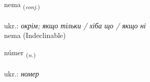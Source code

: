 \documentclass[frontgrid, backgrid]{flacards}\usepackage[]{graphicx}\usepackage[]{xcolor}
\begin{document}

\renewcommand{\flhead}{\vskip5pt \fboxsep=0pt {\small\bfseries\footnotesize Samtenging | сполучник}}
\renewcommand{\fcfoot}{\vskip5pt \fboxsep=0pt \hspace{2pt}{\small\bfseries\footnotesize 1K}}

\renewcommand{\blhead}{\vskip5pt {\small\bfseries\footnotesize Samtenging | сполучник }}
\renewcommand{\bcfoot}{\vskip5pt \hspace{2pt}{\small\bfseries\footnotesize 1K}}


{nema \small{\textsubscript{(\textit{conj.})}} \\[1ex]
\textphonetic{[nɛːma]} \\
ukr.: \emph{окрім; якщо тільки / хіба що / якщо ні} \\  [2ex]
nema (Indeclinable)}

\renewcommand{\flhead}{\vskip5pt \fboxsep=0pt {\small\bfseries\footnotesize Nafnorð | іменник}}
\renewcommand{\fcfoot}{\vskip5pt \fboxsep=0pt \hspace{2pt}{\small\bfseries\footnotesize 1K}}

\renewcommand{\blhead}{\vskip5pt {\small\bfseries\footnotesize Nafnorð | іменник }}
\renewcommand{\bcfoot}{\vskip5pt \hspace{2pt}{\small\bfseries\footnotesize 1K}}


{númer \small{\textsubscript{(\textit{n.})}} \\[1ex] %
\textphonetic{[nuːmɛr]} \\
ukr.: \emph{номер} \\  [2ex]
\renewcommand*{\arraystretch}{0.8}
}

\renewcommand{\flhead}{\vskip5pt \fboxsep=0pt {\small\bfseries\footnotesize Nafnorð | іменник}}
\renewcommand{\fcfoot}{\vskip5pt \fboxsep=0pt \hspace{2pt}{\small\bfseries\footnotesize 1K}}
\end{document}
